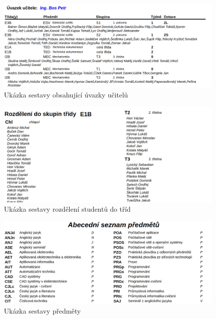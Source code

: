 \begin{figure}[h]
    \centering
    \includegraphics[width=1\linewidth]{Figures/uvazky-ucitelu-ukazka.png}
    \caption{Ukázka sestavy obsahující úvazky učitelů}
    \label{fig:uvazky-ucitelu-ukazka}
\end{figure}

\begin{figure}[H]
    \centering
    \includegraphics[width=1\linewidth]{Figures/skupiny-ukazka.png}
    \caption{Ukázka sestavy rozdělení studentů do tříd}
    \label{fig:ukazka-sestavy-tridy}

\end{figure}
\begin{figure}[H]

    \centering
    \includegraphics[width=1\linewidth]{Figures/predmety-ukazka.png}
    \caption{Ukázka sestavy předměty}
    \label{fig:ukazka-sestavy-predmety}
    
\end{figure}

